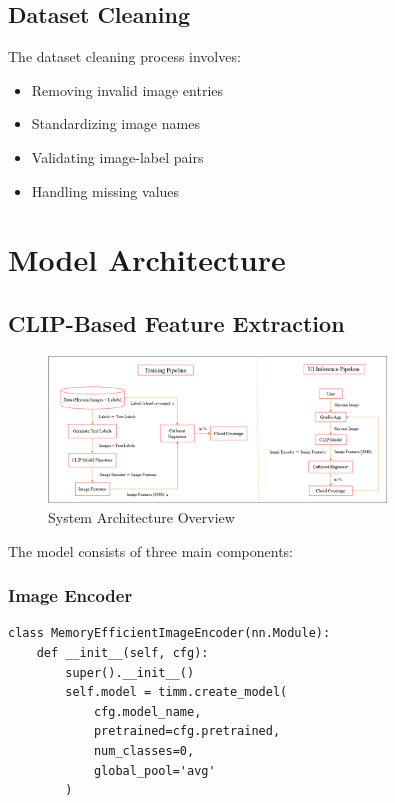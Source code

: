 \documentclass[11pt,a4paper]{article}
\begin{document}
\subsection{Dataset Cleaning}
The dataset cleaning process involves:
\begin{itemize}
    \item Removing invalid image entries
    \item Standardizing image names
    \item Validating image-label pairs
    \item Handling missing values
\end{itemize}

\section{Model Architecture}
\subsection{CLIP-Based Feature Extraction}

\begin{figure}[H]
    \centering
    \includegraphics[width=0.8\textwidth]{archi.png}
    \caption{System Architecture Overview}
    \label{fig:architecture}
\end{figure}
    

The model consists of three main components:

\subsubsection{Image Encoder}
\begin{lstlisting}
class MemoryEfficientImageEncoder(nn.Module):
    def __init__(self, cfg):
        super().__init__()
        self.model = timm.create_model(
            cfg.model_name,
            pretrained=cfg.pretrained,
            num_classes=0,
            global_pool='avg'
        )
\end{lstlisting}
\end{document}

